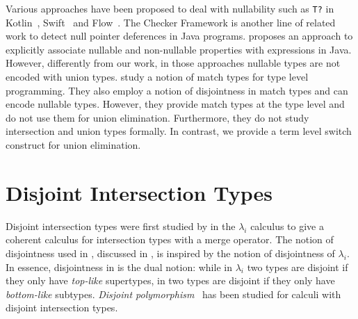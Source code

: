 
Various approaches have been proposed to deal with nullability
such as \lstinline{T?} in Kotlin~\citep{kotlin},
Swift~\citep{swift} and Flow~\citep{chaudhuri2017fast}.
The Checker Framework \citep{papi2008practical}
is another line of related work to detect null pointer deferences in Java programs.
\cite{banerjee2019nullaway} proposes an approach to explicitly associate
nullable and non-nullable properties with expressions in Java.
However, differently from our work,
in those approaches nullable types are not encoded with union types.
\cite{matchtypes2022} study a notion of match types for type level
programming. They also employ a notion of disjointness in match types
and can encode nullable types. However, they provide
match types at the type level and do not use them for union elimination.
Furthermore, they do not study intersection and union types formally.
In contrast, we provide a term level switch construct for union elimination.








\section{Disjoint Intersection Types}
Disjoint intersection types were first
studied by \cite{oliveira2016disjoint} in the $\lambda_{i}$ calculus
to give a coherent calculus for intersection types with a merge
operator. The notion of disjointness used in \name, discussed in ,
is inspired by the notion of disjointness of $\lambda_{i}$. In essence,
disjointness in \name is the dual notion: while in $\lambda_{i}$ two types
are disjoint if they only have \emph{top-like} supertypes, in \name two types
are disjoint if they only have \emph{bottom-like} subtypes.
\emph{Disjoint polymorphism}~\citep{alpuimdisjoint} has been studied for
calculi with disjoint intersection types.

